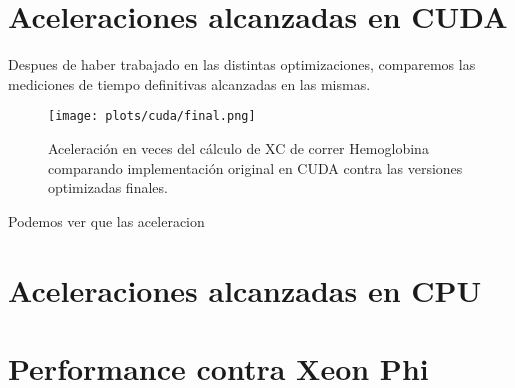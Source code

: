 \section{Aceleraciones alcanzadas en CUDA}

Despues de haber trabajado en las distintas optimizaciones, comparemos las mediciones
de tiempo definitivas alcanzadas en las mismas.

\begin{figure}[htbp]
   \centering
   \texttt{[image: plots/cuda/final.png]}
   \caption{Aceleraci\'on en veces del c\'alculo de XC de correr Hemoglobina comparando implementaci\'on original en CUDA contra
   las versiones optimizadas finales.}
   \label{plt:cuda-final}
\end{figure}

Podemos ver que las aceleracion

\section{Aceleraciones alcanzadas en CPU}

\section{Performance contra Xeon Phi}

